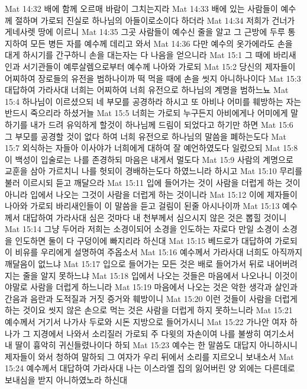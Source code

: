 Mat 14:32  배에 함께 오르매 바람이 그치는지라
Mat 14:33  배에 있는 사람들이 예수께 절하며 가로되 진실로 하나님의 아들이로소이다 하더라
Mat 14:34  저희가 건너가 게네사렛 땅에 이르니
Mat 14:35  그곳 사람들이 예수신 줄을 알고 그 근방에 두루 통지하여 모든 병든 자를 예수께 데리고 와서
Mat 14:36  다만 예수의 옷가에라도 손을 대게 하시기를 간구하니 손을 대는자는 다 나음을 얻으니라
Mat 15:1  그 때에 바리새인과 서기관들이 예루살렘으로부터 예수께 나아와 가로되
Mat 15:2  당신의 제자들이 어찌하여 장로들의 유전을 범하나이까 떡 먹을 때에 손을 씻지 아니하나이다
Mat 15:3  대답하여 가라사대 너희는 어찌하여 너희 유전으로 하나님의 계명을 범하느뇨
Mat 15:4  하나님이 이르셨으되 네 부모를 공경하라 하시고 또 아비나 어미를 훼방하는 자는 반드시 죽으리라 하셨거늘
Mat 15:5  너희는 가로되 누구든지 아비에게나 어미에게 말하기를 내가 드려 유익하게 할것이 하나님께 드림이 되었다고 하기만 하면
Mat 15:6  그 부모를 공경할 것이 없다 하여 너희 유전으로 하나님의 말씀을 폐하는도다
Mat 15:7  외식하는 자들아 이사야가 너희에게 대하여 잘 예언하였도다 일렀으되
Mat 15:8  이 백성이 입술로는 나를 존경하되 마음은 내게서 멀도다
Mat 15:9  사람의 계명으로 교훈을 삼아 가르치니 나를 헛되이 경배하는도다 하였느니라 하시고
Mat 15:10  무리를 불러 이르시되 듣고 깨달으라
Mat 15:11  입에 들어가는 것이 사람을 더럽게 하는 것이 아니라 입에서 나오는 그것이 사람을 더럽게 하는 것이니라
Mat 15:12  이에 제자들이 나아와 가로되 바리새인들이 이 말씀을 듣고 걸림이 된줄 아시나이까
Mat 15:13  예수께서 대답하여 가라사대 심은 것마다 내 천부께서 심으시지 않은 것은 뽑힐 것이니
Mat 15:14  그냥 두어라 저희는 소경이되어 소경을 인도하는 자로다 만일 소경이 소경을 인도하면 둘이 다 구덩이에 빠지리라 하신대
Mat 15:15  베드로가 대답하여 가로되 이 비유를 우리에게 설명하여 주옵소서
Mat 15:16  예수께서 가라사대 너희도 아직까지 깨달음이 없느냐
Mat 15:17  입으로 들어가는 모든 것은 배로 들어가서 뒤로 내어버려지는 줄을 알지 못하느냐
Mat 15:18  입에서 나오는 것들은 마음에서 나오나니 이것이야말로 사람을 더럽게 하느니라
Mat 15:19  마음에서 나오는 것은 악한 생각과 살인과 간음과 음란과 도적질과 거짓 증거와 훼방이니
Mat 15:20  이런 것들이 사람을 더럽게 하는 것이요 씻지 않은 손으로 먹는 것은 사람을 더럽게 하지 못하느니라
Mat 15:21  예수께서 거기서 나가사 두로와 시돈 지방으로 들어가시니
Mat 15:22  가나안 여자 하나가 그 지경에서 나와서 소리질러 가로되 주 다윗의 자손이여 나를 불쌍히 여기소서 내 딸이 흉악히 귀신들렸나이다 하되
Mat 15:23  예수는 한 말씀도 대답지 아니하시니 제자들이 와서 청하여 말하되 그 여자가 우리 뒤에서 소리를 지르오니 보내소서
Mat 15:24  예수께서 대답하여 가라사대 나는 이스라엘 집의 잃어버린 양 외에는 다른데로 보내심을 받지 아니하였노라 하신대
